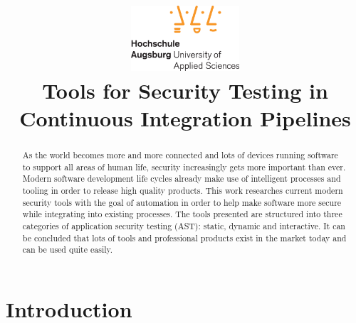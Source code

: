 \documentclass[conference]{IEEEtran}
\begin{document}
\title{
	\includegraphics[width=4cm]{fig/hsa_logo.eps}\\
	\vspace{0.6cm}
	Tools for Security Testing in Continuous Integration Pipelines}

\author{
}

\maketitle

% 

\begin{abstract}
	
	As the world becomes more and more connected and lots of devices running software to support all areas of human life, security increasingly gets more important than ever. Modern software development life cycles already make use of intelligent processes and tooling in order to release high quality products. This work researches current modern security tools with the goal of automation in order to help make software more secure while integrating into existing processes. The tools presented are structured into three categories of application security testing (AST): static, dynamic and interactive. It can be concluded that lots of tools and professional products exist in the market today and can be used quite easily.
\end{abstract}


\section{Introduction}
\end{document}

